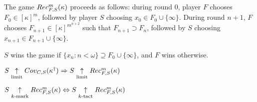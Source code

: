   \begin{defn}
    The game $Rec^{m}_{F,S}(\kappa)$ proceeds as follows: during round $0$, player $F$ chooses $F_0\in[\kappa]^m$, followed by player $S$ choosing $x_0\in F_0\cup\{\infty\}$. During round $n+1$, $F$ chooses $F_{n+1}\in[\kappa]^{m^{n+2}}$ such that $F_{n+1}\supset F_n$, followed by $S$ choosing $x_{n+1}\in F_{n+1}\cup\{\infty\}$.

    $S$ wins the game if $\{x_n : n<\omega\}\supseteq F_0\cup\{\infty\}$, and $F$ wins otherwise.
  \end{defn}

  \begin{prop}
    $S\underset{\text{limit}}{\uparrow}Cov_{C,S}(\kappa^\dagger) \Rightarrow S\underset{\text{limit}}{\uparrow}Rec^{m}_{F,S}(\kappa)$
  \end{prop}

  \begin{prop}
    $S\underset{k\text{-mark}}{\uparrow}Rec^{m}_{F,S}(\kappa) \Leftrightarrow S\underset{k\text{-tact}}{\uparrow}Rec^{m}_{F,S}(\kappa)$
  \end{prop}